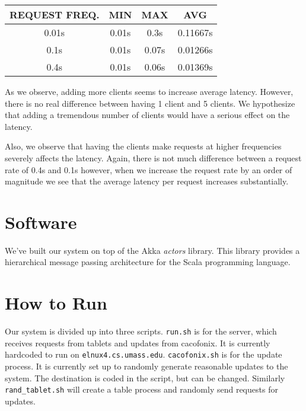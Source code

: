 \documentclass[11pt]{article}
\begin{document}
\begin{tabular}{c|c|c|c}
  REQUEST FREQ. & MIN & MAX & AVG \\
  \hline
  0.01s & 0.01s & 0.3s  & 0.11667s \\
  0.1s  & 0.01s & 0.07s & 0.01266s \\
  0.4s  & 0.01s & 0.06s & 0.01369s \\
\end{tabular}

As we observe, adding more clients seems to increase average
latency.  However, there is no real difference between having 1 client
and 5 clients.  We hypothesize that adding a tremendous number of
clients would have a serious effect on the latency.

Also, we observe that having the clients make requests at higher
frequencies severely affects the latency.  Again, there is not much
difference between a request rate of 0.4s and 0.1s however, when we
increase the request rate by an order of magnitude we see that the
average latency per request increases substantially.

\section{Software}
We've built our system on top of the Akka \emph{actors} library.  This
library provides a hierarchical message passing architecture for the
Scala programming language.

\section{How to Run}

Our system is divided up into three scripts. \texttt{run.sh} is for the server, which receives requests from tablets and updates from cacofonix. It is currently hardcoded to run on \texttt{elnux4.cs.umass.edu}. \texttt{cacofonix.sh} is for the update process. It is currently set up to randomly generate reasonable updates to the system. The destination is coded in the script, but can be changed. Similarly \texttt{rand_tablet.sh} will create a table process and randomly send requests for updates.
\end{document}
